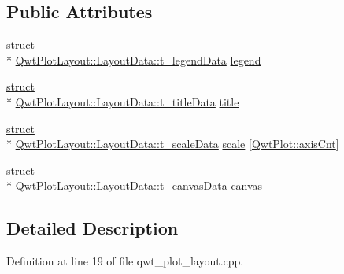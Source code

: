 \subsection*{Public Attributes}
\begin{DoxyCompactItemize}
\item 
\hyperlink{sdlgamepad_8dox_aba655c5729da86df745f0c8e7f9ba8d2}{struct} \\*
\hyperlink{struct_qwt_plot_layout_1_1_layout_data_1_1t__legend_data}{Qwt\-Plot\-Layout\-::\-Layout\-Data\-::t\-\_\-legend\-Data} \hyperlink{class_qwt_plot_layout_1_1_layout_data_a31526cb1d638ce4dca3718d46ba7356c}{legend}
\item 
\hyperlink{sdlgamepad_8dox_aba655c5729da86df745f0c8e7f9ba8d2}{struct} \\*
\hyperlink{struct_qwt_plot_layout_1_1_layout_data_1_1t__title_data}{Qwt\-Plot\-Layout\-::\-Layout\-Data\-::t\-\_\-title\-Data} \hyperlink{class_qwt_plot_layout_1_1_layout_data_abd898725188ecaa2176f40bd0b7c938e}{title}
\item 
\hyperlink{sdlgamepad_8dox_aba655c5729da86df745f0c8e7f9ba8d2}{struct} \\*
\hyperlink{struct_qwt_plot_layout_1_1_layout_data_1_1t__scale_data}{Qwt\-Plot\-Layout\-::\-Layout\-Data\-::t\-\_\-scale\-Data} \hyperlink{class_qwt_plot_layout_1_1_layout_data_af720ce68cae6a7fcbad9c0ca63b4fd58}{scale} \mbox{[}\hyperlink{class_qwt_plot_a81df699dcf9dde0752c0726b5f31e271aea62036dfd48ee0f9450718592614892}{Qwt\-Plot\-::axis\-Cnt}\mbox{]}
\item 
\hyperlink{sdlgamepad_8dox_aba655c5729da86df745f0c8e7f9ba8d2}{struct} \\*
\hyperlink{struct_qwt_plot_layout_1_1_layout_data_1_1t__canvas_data}{Qwt\-Plot\-Layout\-::\-Layout\-Data\-::t\-\_\-canvas\-Data} \hyperlink{class_qwt_plot_layout_1_1_layout_data_a21b974d44662270c906d9e800f8f8af4}{canvas}
\end{DoxyCompactItemize}


\subsection{Detailed Description}


Definition at line 19 of file qwt\-\_\-plot\-\_\-layout.\-cpp.



